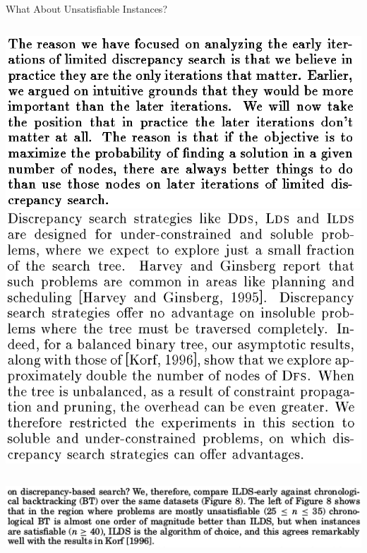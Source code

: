 \documentclass{beamer}
\begin{document}
\begin{frame}{What About Unsatisfiable Instances?}

    \begin{columns}[T]
        \centering\includegraphics*[keepaspectratio=true,scale=0.2]{images/lds-unsat.png}
        \centering\includegraphics*[keepaspectratio=true,scale=0.2]{images/dds-unsat.png}
    \end{columns}

    \vspace{2em}

    \centering\includegraphics*[keepaspectratio=true,scale=0.4]{images/ldsr-bt.png}

\end{frame}
\end{document}
